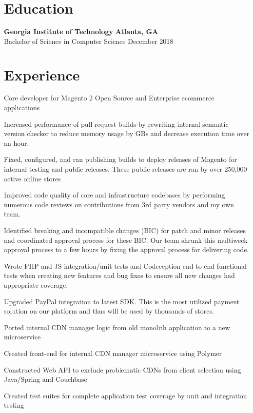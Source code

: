 \documentclass[line]{resume}
\begin{document}
\begin{center}
\end{center}
\section{Education}
\textbf{Georgia Institute of Technology} \hfill \textbf{Atlanta, GA} \\
Bachelor of Science in Computer Science  \hfill December 2018
\section{Experience}
\begin{myitemize}
	\item Core developer for Magento 2 Open Source and Enterprise ecommerce applications
	\item Increased performance of pull request builds by rewriting internal semantic version checker to reduce memory usage by GBs and decrease execution time over an hour.
	\item Fixed, configured, and ran publishing builds to deploy releases of Magento for internal testing and public releases. These public releases are ran by over 250,000 active online stores
	\item Improved code quality of core and infrastructure codebases by performing numerous code reviews on contributions from 3rd party vendors and my own team.
	\item Identified breaking and incompatible changes (BIC) for patch and minor releases and coordinated approval process for these BIC. Our team shrunk this multiweek approval process to a few hours by fixing the approval process for delivering code.
	\item Wrote PHP and JS integration/unit tests and Codeception end-to-end functional tests when creating new features and bug fixes to ensure all new changes had appropriate coverage.
	\item Upgraded PayPal integration to latest SDK. This is the most utilized payment solution on our platform and thus will be used by thousands of stores.
\end{myitemize}
\begin{myitemize}
	\item Ported internal CDN manager logic from old monolith application to a new microservice
	\item Created front-end for internal CDN manager microservice using Polymer
	\item Constructed Web API to exclude problematic CDNs from client selection using Java/Spring and Couchbase
	\item Created test suites for complete application test coverage by unit and integration testing
\end{myitemize}
\end{document}
